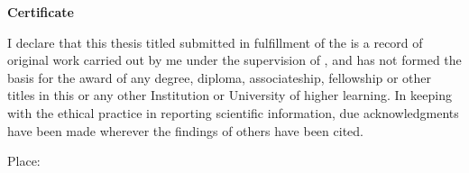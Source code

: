 
\thispagestyle{empty}

\makeatletter
\def\vhrulefill#1{\leavevmode\leaders\hrule\@height#1\hfill \kern\z@}
\makeatother

\vspace*{0.7in}

\begin{center}
  \textbf{\large Certificate}
\end{center}

\vspace*{0.5in}

\noindent I declare that this thesis titled {\bf \ThesisTitlePlaintext}
submitted in fulfillment of the {\bf \Branch} is a record
of original work carried out by me under the supervision of {\bf
\Supervisor}, and has not formed the basis for the award of any
degree, diploma, associateship, fellowship or other titles in this or
any other Institution or University of higher learning. In keeping
with the ethical practice in reporting scientific information, due
acknowledgments have been made wherever the findings of others have been cited.



\vspace*{1in}

\noindent
\begin{minipage}{0.97\textwidth}
  \begin{minipage}{0.50\linewidth}
    \begin{flushleft}
      Place: {\bf \DeptType}\\
      {\bf \TimeOfSubmission}
    \end{flushleft}
  \end{minipage}
  \hfill
  \begin{minipage}{0.50\linewidth}
  \vspace*{0.4in}
    \begin{flushright}
      {\bf \Supervisor} \\
      \SupervisorTitle\\
      \Department \\
    \end{flushright}
  \end{minipage}
\end{minipage}

\vfill
